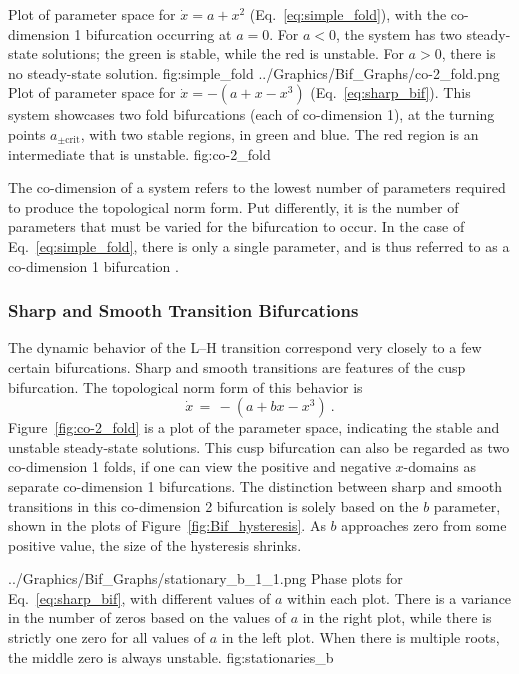 	{Plot of parameter space for $\dot{x} = a + x^2$ (Eq.~\ref{eq:simple_fold}), with the co-dimension 1 bifurcation occurring at $a = 0$. %
	For $a < 0$, the system has two steady-state solutions; the green is stable, while the red is unstable.
	For $a > 0$, there is no steady-state solution.}
	{fig:simple_fold}
	{../Graphics/Bif_Graphs/co-2_fold.png}
	{Plot of parameter space for $\dot{x} = -(a + x - x^3)$ (Eq.~\ref{eq:sharp_bif}). %
	This system showcases two fold bifurcations (each of co-dimension 1), at the turning points $a_{\pm\text{crit}}$, with two stable regions, in green and blue. %
	The red region is an intermediate that is unstable.}
	{fig:co-2_fold}

The co-dimension of a system refers to the lowest number of parameters required to produce the topological norm form.
Put differently, it is the number of parameters that must be varied for the bifurcation to occur.
In the case of Eq.~\ref{eq:simple_fold}, there is only a single parameter, and is thus referred to as a co-dimension 1 bifurcation \cite{weymiens_bifurcation_2014}.

\subsubsection{Sharp and Smooth Transition Bifurcations}

The dynamic behavior of the L--H transition correspond very closely to a few certain bifurcations.
Sharp and smooth transitions are features of the cusp bifurcation.
The topological norm form of this behavior is
\begin{equation}
	\dot{x} \,=\, -(a + bx - x^3)~.
	\label{eq:sharp_bif}
\end{equation}
Figure~\ref{fig:co-2_fold} is a plot of the parameter space, indicating the stable and unstable steady-state solutions.
This cusp bifurcation can also be regarded as two co-dimension 1 folds, if one can view the positive and negative $x$-domains as separate co-dimension 1 bifurcations.
The distinction between sharp and smooth transitions in this co-dimension 2 bifurcation is solely based on the $b$ parameter, shown in the plots of Figure~\ref{fig:Bif_hysteresis}.
As $b$ approaches zero from some positive value, the size of the hysteresis shrinks.

	{../Graphics/Bif_Graphs/stationary_b_1_1.png}
	{Phase plots for Eq.~\ref{eq:sharp_bif}, with different values of $a$ within each plot. %
	There is a variance in the number of zeros based on the values of $a$ in the right plot, while there is strictly one zero for all values of $a$ in the left plot. %
	When there is multiple roots, the middle zero is always unstable.}
	{fig:stationaries_b}

